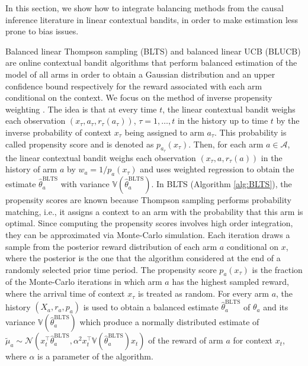 \documentclass[letterpaper]{article} %
\newcommand{\field}[1]{\mathbb{#1}}
\def\A{\mathcal{A}}
\def\N{\mathcal{N}}
\def\V{\field{V}}
\def\V{\mathbb{V}}
\begin{document}
In this section, we show how to integrate balancing methods from the causal inference literature in linear contextual bandits, in order to make estimation less prone to bias issues.

Balanced linear Thompson sampling (BLTS) and balanced linear UCB (BLUCB) are online contextual bandit algorithms that perform balanced estimation of the model of all arms in order to obtain a Gaussian distribution and an upper confidence bound respectively for the reward associated with each arm conditional on the context.
We focus on the method of inverse propensity weighting \cite{imbens-ci}.
The idea is that at every time $t$, the linear contextual bandit weighs each observation $(x_\tau, a_\tau, r_\tau(a_\tau))$, $\tau = 1, \dots, t$ in the history up to time $t$ by the inverse probability of context $x_\tau$ being assigned to arm $a_\tau$. This probability is called propensity score and is denoted as $p_{a_\tau}(x_\tau)$. Then, for each arm $a \in \A$, the linear contextual bandit weighs each observation $(x_\tau, a, r_\tau(a))$ in the history of arm $a$ by $w_{a} = 1 / p_{a}(x_\tau)$ and uses weighted regression to obtain the estimate $\hat{\theta}^\text{BLTS}_a$ with variance $\V(\hat\theta^\text{BLTS}_a)$.
In BLTS (Algorithm \ref{alg:BLTS}), the propensity scores are known because Thompson sampling performs probability matching, i.e., it assigns a context to an arm with the probability that this arm is optimal.
Since computing the propensity scores involves high order integration, they can be approximated via Monte-Carlo simulation. 
Each iteration draws a sample from the posterior reward distribution of each arm $a$ conditional on $x$, where the posterior is the one that the algorithm considered at the end of a randomly selected prior time period. 
The propensity score $p_a(x_\tau)$ is the fraction of the Monte-Carlo iterations in which arm $a$ has the highest sampled reward, where the arrival time of context $x_\tau$ is treated as random.  
For every arm $a$, the history $(X_a, r_a, p_a)$ is used to obtain a balanced estimate $\hat{\theta}^\text{BLTS}_a$ of $\theta_a$ and its variance $\V(\hat\theta^\text{BLTS}_a)$ which produce a normally distributed estimate of $\tilde{\mu}_a \sim \N\left(x_t^\top \hat{\theta}^\text{BLTS}_a, \alpha^2 x_t^\top \V(\hat\theta^\text{BLTS}_a) x_t\right)$ of the reward of arm $a$ for context $x_t$, where $\alpha$ is a parameter of the algorithm.
\end{document}

